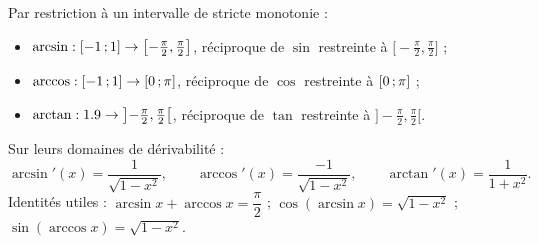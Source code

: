 \begin{definition}
Par restriction à un intervalle de stricte monotonie :
\begin{itemize}[label={\color{otNavy}\textbullet},leftmargin=1.4em,itemsep=0.6mm,topsep=0.8mm]
  \item $\arcsin:\mathopen{[}-1\,{;}\,1\mathclose{]}\to\bigl[-\frac{\pi}{2},\frac{\pi}{2}\bigr]$,
    réciproque de $\sin$ restreinte à $\bigl[-\frac{\pi}{2},\frac{\pi}{2}\bigr]$ ;
  \item $\arccos:\mathopen{[}-1\,{;}\,1\mathclose{]}\to\mathopen{[}0\,{;}\,\pi\mathclose{]}$, réciproque de $\cos$ restreinte à $\mathopen{[}0\,{;}\,\pi\mathclose{]}$ ;
  \item $\arctan:1.9\to\bigl]-\frac{\pi}{2},\frac{\pi}{2}\bigr[$, réciproque de $\tan$
    restreinte à $\bigl]-\frac{\pi}{2},\frac{\pi}{2}\bigr[$.
\end{itemize}
\end{definition}

\begin{propriete}[Dérivées]
Sur leurs domaines de dérivabilité :
\[
  \arcsin'(x)=\frac{1}{\sqrt{1-x^{2}}},\qquad
  \arccos'(x)=\frac{-1}{\sqrt{1-x^{2}}},\qquad
  \arctan'(x)=\frac{1}{1+x^{2}}.
\]
Identités utiles : $\arcsin x+\arccos x=\dfrac{\pi}{2}$ ;
$\cos(\arcsin x)=\sqrt{1-x^{2}}$ ;
$\sin(\arccos x)=\sqrt{1-x^{2}}$.
\end{propriete}

